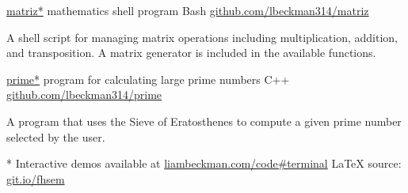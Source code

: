 \myBreak

\showoff
{\href{https://liambeckman.com/code/matriz}{matriz*}}
{mathematics shell program}
{Bash}
{\href{https://github.com/lbeckman314/matriz}{github.com/lbeckman314/matriz}}

A shell script for managing matrix operations including multiplication, addition, and transposition. A matrix generator is included in the available functions.

\myBreak

\showoff
{\href{https://liambeckman.com/code/matriz}{prime*}}
{program for calculating large prime numbers}
{C++}
{\href{https://github.com/lbeckman314/prime}{github.com/lbeckman314/prime}}

A program that uses the Sieve of Eratosthenes to compute a given prime number selected by the user.

\myBreak
\vfill
* Interactive demos available at \textcolor{my-blue}{\href{https://liambeckman.com/code\#terminal}{liambeckman.com/code\#terminal}}
\hfill\textcolor{my-red}{\LaTeX{} source: \href{https://git.io/fhsem}{git.io/fhsem}}


